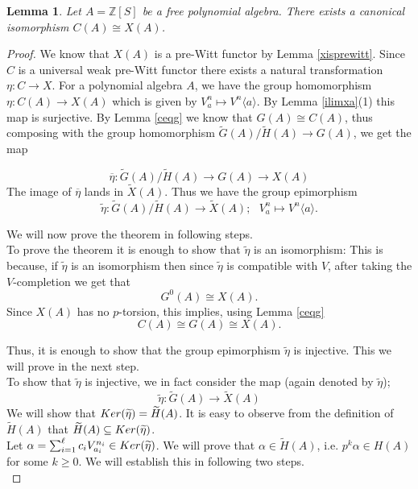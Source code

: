 \documentclass[10pt]{amsart}
\theoremstyle{plain}
\newtheorem{lemma}[thm]{Lemma}
\theoremstyle{definition}
\newcommand{\Ker}{{\rm Ker  }}
\renewcommand{\tilde}{\widetilde}
\newcommand{\Z}{{\mathbb Z}}
\newcommand{\ab}[1]{\langle {#1} \rangle}
\begin{document}
\begin{lemma} \label{genrelxa} Let $A=\Z[S]$ be a free polynomial algebra. 
There exists a canonical isomorphism  $C(A) \cong X(A)$. 
\end{lemma}
\begin{proof}
We know that $X(A)$ is a pre-Witt functor by Lemma \ref{xisprewitt}. Since $C$ is a universal weak pre-Witt functor there exists a natural transformation $\eta: C \to X$. For a polynomial algebra $A$, we have the group homomorphism $\eta: C(A) \to X(A)$ which is given by $V^n_a \mapsto V^n\ab{a}$.  By Lemma \ref{ilimxa}(1) this map is surjective. By Lemma \ref{ceqg} we know that $G(A)\cong C(A)$, thus composing with the group homomorphism $\tilde{G}(A)/\tilde{H}(A) \to G(A)$, we get the map 
 
$$\overline{\eta}: \tilde{G}(A)/\tilde{H}(A) \to G(A) \to X(A)$$
The image of $\overline{\eta}$ lands in $\tilde{X}(A)$. Thus we have the group epimorphism 
$$\tilde{\eta}:  \tilde{G}(A)/\tilde{H}(A) \to \tilde{X}(A);  \  \ \ V^n_a \mapsto V^n\ab{a} .$$

\noindent We will now prove the theorem in following steps.\\

 To prove the theorem it is enough to show that $\tilde{\eta}$ is an isomorphism: This is because, if $\tilde{\eta}$ is an isomorphism then since $\tilde{\eta}$ is compatible with $V$, after taking the $V$-completion we get that $$G^0(A) \cong X(A).$$ Since $X(A)$ has no $p$-torsion, this implies, using Lemma \ref{ceqg} $$C(A) \cong G(A) \cong X(A).$$

\noindent Thus, it is enough to show that the group epimorphism $\tilde{\eta}$ is injective.  This we will prove in the next step.\\

 To show that $\tilde{\eta}$ is injective, we in fact consider the map (again denoted by $\tilde{\eta}$);
$$\tilde{\eta}: \tilde{G}(A) \to \tilde{X}(A)$$
We will show that $\Ker(\tilde{\eta}) = \tilde{H}(A)$. It is easy to observe from the definition of $\tilde{H}(A)$ that $\tilde{H}(A) \subseteq \Ker(\tilde{\eta})$. \\

Let  $\alpha= \sum_{i=1}^\ell c_i V^{n_i}_{a_i} \in \Ker(\tilde{\eta})$. We will prove that $\alpha\in \tilde{H}(A)$, i.e. 
$p^k \alpha \in H(A)$ for some $k \geq 0$. We will establish this in following two steps.\\


\end{proof}
\end{document}
